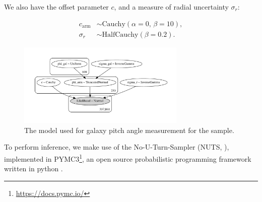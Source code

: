 We also have the offset parameter $c$, and a measure of radial uncertainty $\sigma_r$:

\begin{align}
  c_\mathrm{arm} &\sim \mathrm{Cauchy}(\alpha=0,\,\beta=10),\\
  \sigma_r &\sim \mathrm{HalfCauchy}(\beta=0.2).
\end{align}

\begin{figure}
  \includegraphics[width=8cm]{plots/plots_n109d1000t500/model.pdf}
  \caption{The model used for galaxy pitch angle measurement for the sample.}
  \label{fig:pymc3-model}
\end{figure}

To perform inference, we make use of the No-U-Turn-Sampler (NUTS, \citealt{2011arXiv1111.4246H}), implemented in PYMC3\footnote{\url{https://docs.pymc.io/}}, an open source probabilistic programming framework written in python \citep{pymc3_paper}.
